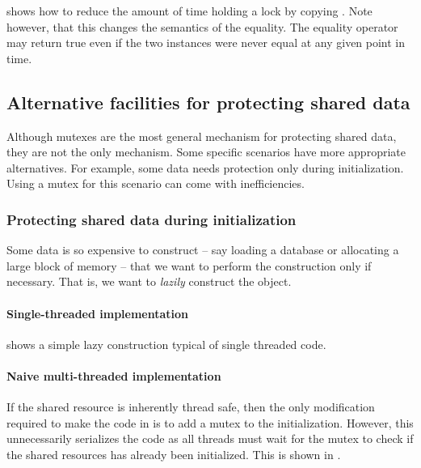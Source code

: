  shows how to reduce the amount of time holding a lock by copying . Note however, that this changes the semantics of the equality. The equality operator may return true even if the two instances were never equal at any given point in time. 


\subsection{Alternative facilities for protecting shared data}
Although mutexes are the most general mechanism for protecting shared data, they are not the only mechanism. Some specific scenarios have more appropriate alternatives. For example, some data needs protection only during initialization. Using a mutex for this scenario can come with inefficiencies. 

\subsubsection{Protecting shared data during initialization}
Some data is so expensive to construct -- say loading a database or allocating a large block of memory -- that we want to perform the construction only if necessary. That is, we want to \emph{lazily} construct the object. 

\paragraph{Single-threaded implementation}
 shows a simple lazy construction typical of single threaded code.


\paragraph{Naive multi-threaded implementation}
If the shared resource is inherently thread safe, then the only modification required to make the code in  is to add a mutex to the initialization. However, this unnecessarily serializes the code as all threads must wait for the mutex to check if the shared resources has already been initialized. This is shown in .

